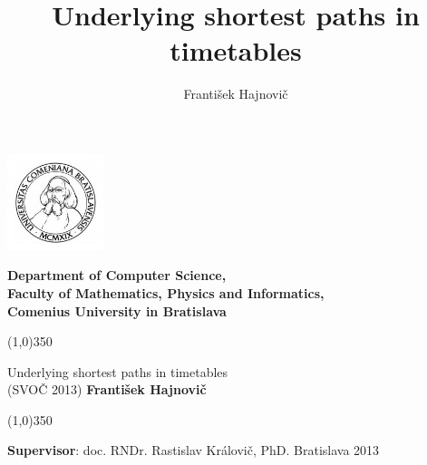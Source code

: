\documentclass{svk_long_en}
\begin{document}
	\onecolumn    
    
    \begin{center}
        \begin{minipage}{0.25\textwidth} \includegraphics[width=28mm]{logouk.png} \end{minipage}
        \begin{minipage}{0.74\textwidth}
        \textbf{\large\sc
            Department of Computer Science, \\
            Faculty of Mathematics, Physics and Informatics, \\
            Comenius University in Bratislava
        }
        \end{minipage}

        \vskip 6cm

        \begin{center} \line(1,0){350} \end{center}
        {\LARGE\sc Underlying shortest paths in timetables} \\
        \large{(SVOČ 2013)}
        \vskip 0.5cm
        \textbf{\large František Hajnovič}
        \begin{center} \line(1,0){350} \end{center}

        \vfill
    \end{center}

    \textbf{Supervisor}: doc. RNDr. Rastislav Královič, PhD.   \hfill Bratislava 2013

    \pagebreak

	\twocolumn
	

    \title{Underlying shortest paths in timetables}
	\author{František Hajnovič
	}
	
\end{document}
